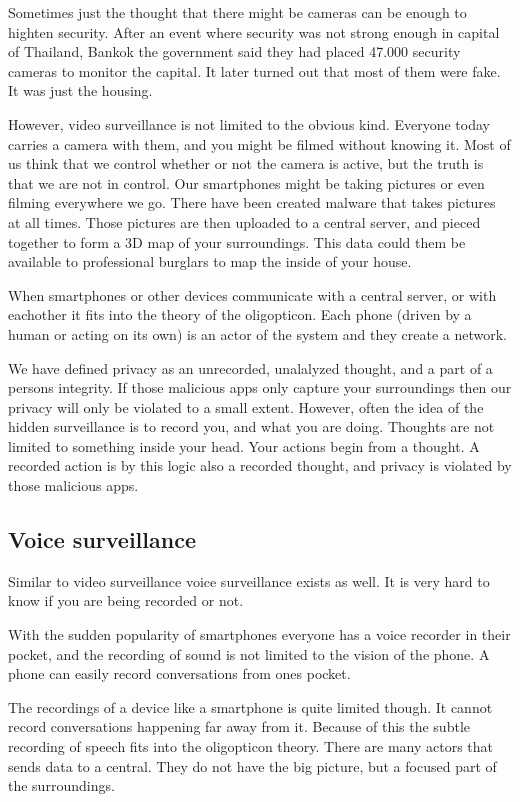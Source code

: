 Sometimes just the thought that there might be cameras can be enough to highten security. After an event where security was not strong enough in capital of Thailand, Bankok the government said they had placed 47.000 security cameras to monitor the capital. It later turned out that most of them were fake. It was just the housing.\cite{website:bangkok-security}

However, video surveillance is not limited to the obvious kind. Everyone today carries a camera with them, and you might be filmed without knowing it. Most of us think that we control whether or not the camera is active, but the truth is that we are not in control. Our smartphones might be taking pictures or even filming everywhere we go. There have been created malware that takes pictures at all times. Those pictures are then uploaded to a central server, and pieced together to form a 3D map of your surroundings. This data could them be available to professional burglars to map the inside of your house.\cite{website:placeraider}

When smartphones or other devices communicate with a central server, or with eachother it fits into the theory of the oligopticon. Each phone (driven by a human or acting on its own) is an actor of the system and they create a network.

We have defined privacy as an unrecorded, unalalyzed thought, and a part of a persons integrity. If those malicious apps only capture your surroundings then our privacy will only be violated to a small extent. However, often the idea of the hidden surveillance is to record you, and what you are doing. Thoughts are not limited to something inside your head. Your actions begin from a thought. A recorded action is by this logic also a recorded thought, and privacy is violated by those malicious apps.

\subsection{Voice surveillance}
Similar to video surveillance voice surveillance exists as well. It is very hard to know if you are being recorded or not.

With the sudden popularity of smartphones everyone has a voice recorder in their pocket, and the recording of sound is not limited to the vision of the phone. A phone can easily record conversations from ones pocket.\cite{website:carrier-iq}

The recordings of a device like a smartphone is quite limited though. It cannot record conversations happening far away from it. Because of this the subtle recording of speech fits into the oligopticon theory. There are many actors that sends data to a central. They do not have the big picture, but a focused part of the surroundings.

